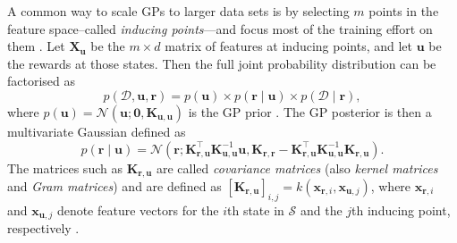 \documentclass{mpaper}
\newcommand{\Kuu}{\mathbf{K}_{\mathbf{u},\mathbf{u}}}
\newcommand{\Krr}{\mathbf{K}_{\mathbf{r},\mathbf{r}}}
\newcommand{\Kru}{\mathbf{K}_{\mathbf{r},\mathbf{u}}}
\newcommand{\pfull}{p(\mathcal{D}, \mathbf{u}, \mathbf{r})}
\begin{document}
A common way to scale GPs to larger data sets is by selecting $m$ points in the
feature space--called \emph{inducing points}---and focus most of the training
effort on them \cite{DBLP:journals/corr/abs-1807-01065}. Let $\mathbf{X_u}$ be
the $m \times d$ matrix of features at inducing points, and let $\mathbf{u}$ be
the rewards at those states. Then the full joint probability distribution can be
factorised as
\begin{equation} \label{eq:full}
  \pfull = p(\mathbf{u}) \times p(\mathbf{r} \mid \mathbf{u}) \times
  p(\mathcal{D} \mid \mathbf{r}),
\end{equation}
where $p(\mathbf{u}) = \mathcal{N}(\mathbf{u}; \mathbf{0}, \Kuu)$ is the GP
prior \cite{DBLP:books/lib/RasmussenW06}. The GP posterior is then a
multivariate Gaussian \cite{DBLP:conf/nips/LevinePK11} defined as
\begin{equation} \label{eq:r}
  p(\mathbf{r} \mid \mathbf{u}) =
  \mathcal{N}(\mathbf{r}; \Kru^\intercal\Kuu^{-1}\mathbf{u}, \Krr - \Kru^\intercal\Kuu^{-1}\Kru).
\end{equation}
The matrices such as
$\Kru$ are called \emph{covariance matrices} (also \emph{kernel matrices} and
\emph{Gram matrices}) and are defined as
$[\Kru]_{i,j} = k(\mathbf{x}_{\mathbf{r},i},
\mathbf{x}_{\mathbf{u},j})$, where $\mathbf{x}_{\mathbf{r},i}$ and
$\mathbf{x}_{\mathbf{u},j}$ denote feature vectors for the $i$th state in
$\mathcal{S}$ and the $j$th inducing point, respectively
\cite{DBLP:conf/uai/JinDAS17}.
\end{document}
